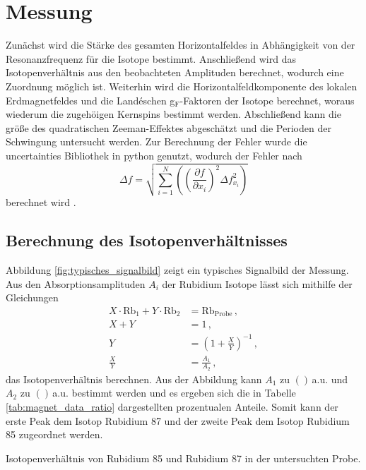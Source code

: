 \clearpage
\section{Messung} %
\label{sec:messung}

Zunächst wird die Stärke des gesamten Horizontalfeldes in Abhängigkeit von der Resonanzfrequenz für die Isotope bestimmt.
Anschließend wird das Isotopenverhältnis aus den beobachteten Amplituden berechnet, wodurch eine Zuordnung möglich ist.
Weiterhin wird die Horizontalfeldkomponente des lokalen Erdmagnetfeldes und die Landéschen g$_\text{F}$-Faktoren der Isotope berechnet, woraus wiederum die zugehöigen Kernspins bestimmt werden.
Abschließend kann die größe des quadratischen Zeeman-Effektes abgeschätzt und die Perioden der Schwingung untersucht werden.
Zur Berechnung der Fehler wurde die uncertainties Bibliothek in python genutzt, wodurch der Fehler nach
\begin{equation*}
    \Delta f = \sqrt{\sum_{i=1}^N \left( \left(\frac{\partial f}{\partial x_i}\right)^2  \Delta f_{x_i}^2 \right)}
\end{equation*}
berechnet wird \cite{py-uncertainties}.

\subsection{Berechnung des Isotopenverhältnisses} %
\label{sub:berechnung_des_isotopenver}

Abbildung \ref{fig:typisches_signalbild} zeigt ein typisches Signalbild der Messung.
Aus den Absorptionsamplituden $A_i$ der Rubidium Isotope lässt sich mithilfe der Gleichungen
\begin{align*}
    X \cdot \text{Rb}_1 + Y \cdot \text{Rb}_2 &= \text{Rb}_\text{Probe}\,,\\
    X + Y &= 1\,,\\
    Y &= \left(1 + \frac{X}{Y} \right)^{-1}\,,\\
    \frac{X}{Y} &= \frac{A_1}{A_2}\,,
\end{align*}
das Isotopenverhältnis berechnen.
Aus der Abbildung kann $A_1$ zu $()\,$a.u. und $A_2$ zu $()\,$a.u. bestimmt werden und es ergeben sich die in Tabelle \ref{tab:magnet_data_ratio} dargestellten prozentualen Anteile.
Somit kann der erste Peak dem Isotop Rubidium 87 und der zweite Peak dem Isotop Rubidium 85 zugeordnet werden.

\begin{table}[!h]
    \centering
    \caption{Isotopenverhältnis von Rubidium 85 und Rubidium 87 in der untersuchten Probe.}
    
    \label{tab:magnet_data_ratio}
\end{table}

